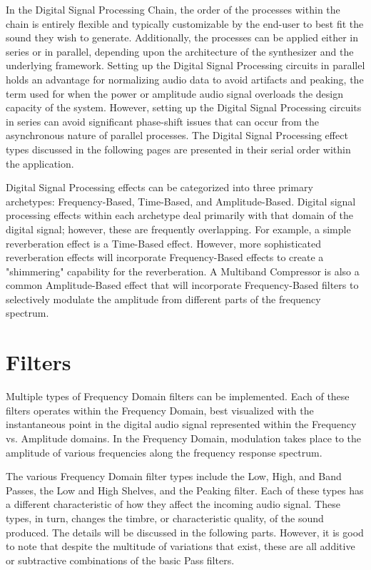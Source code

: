 \documentclass[a4paper,12pt]{report}
\begin{document}
In the Digital Signal Processing Chain, the order of the processes within the chain is entirely flexible and typically customizable by the end-user to best fit the sound they wish to generate. Additionally, the processes can be applied either in series or in parallel, depending upon the architecture of the synthesizer and the underlying framework. Setting up the Digital Signal Processing circuits in parallel holds an advantage for normalizing audio data to avoid artifacts and peaking, the term used for when the power or amplitude audio signal overloads the design capacity of the system. However, setting up the Digital Signal Processing circuits in series can avoid significant phase-shift issues that can occur from the asynchronous nature of parallel processes. The Digital Signal Processing effect types discussed in the following pages are presented in their serial order within the application.

Digital Signal Processing effects can be categorized into three primary archetypes: Frequency-Based, Time-Based, and Amplitude-Based. Digital signal processing effects within each archetype deal primarily with that domain of the digital signal; however, these are frequently overlapping. For example, a simple reverberation effect is a Time-Based effect. However, more sophisticated reverberation effects will incorporate Frequency-Based effects to create a "shimmering" capability for the reverberation. A Multiband Compressor is also a common Amplitude-Based effect that will incorporate Frequency-Based filters to selectively modulate the amplitude from different parts of the frequency spectrum.

\section{Filters}
\label{sec:filters}
Multiple types of Frequency Domain filters can be implemented. Each of these filters operates within the Frequency Domain, best visualized with the instantaneous point in the digital audio signal represented within the Frequency vs. Amplitude domains. In the Frequency Domain, modulation takes place to the amplitude of various frequencies along the frequency response spectrum. 

The various Frequency Domain filter types include the Low, High, and Band Passes, the Low and High Shelves, and the Peaking filter. Each of these types has a different characteristic of how they affect the incoming audio signal. These types, in turn, changes the timbre, or characteristic quality, of the sound produced. The details will be discussed in the following parts. However, it is good to note that despite the multitude of variations that exist, these are all additive or subtractive combinations of the basic Pass filters.
\end{document}
